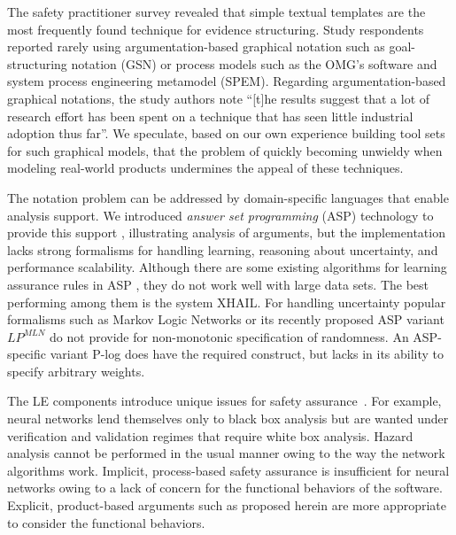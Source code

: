 
The safety practitioner survey revealed that simple textual templates are the most frequently found technique for evidence structuring. Study respondents reported rarely using argumentation-based graphical notation such as goal-structuring notation (GSN) or process models such as the OMG's software and system process engineering metamodel (SPEM).  Regarding argumentation-based graphical notations, the study authors note ``[t]he results suggest that a lot of research effort has been spent on a technique that has seen little industrial adoption thus far''.  We speculate, based on our own experience building tool sets for such graphical models, that the problem of quickly becoming unwieldy when modeling real-world products undermines the appeal of these techniques. 

The notation problem can be addressed by domain-specific languages that enable analysis support.  We introduced {\em answer set programming\/} (ASP) technology to provide this support \cite{CertWareABSA}, illustrating analysis of arguments, but the implementation lacks strong formalisms for handling learning, reasoning about uncertainty, and performance scalability.  Although there are some existing algorithms for learning assurance rules in ASP \cite{ray2009nonmonotonic,athakravi2013learning,law2014inductive,athakravi2015inductive,iled,kazmi2017improving}, they do not work well with large data sets. The best performing among them is the system XHAIL.  For handling uncertainty popular formalisms such as Markov Logic Networks or its recently proposed ASP variant $LP^{MLN}$ do not provide for non-monotonic specification of randomness.  An ASP-specific variant P-log does have the required construct, but lacks in its ability to specify arbitrary weights.  

The LE components introduce unique issues for safety assurance~\cite{SafetyANN}. For example, neural networks lend themselves only to black box analysis but are wanted under verification and validation regimes that require white box analysis.  Hazard analysis cannot be performed in the usual manner owing to the way the network algorithms work.  Implicit, process-based safety assurance is insufficient for neural networks owing to a lack of concern for the functional behaviors of the software.  Explicit, product-based arguments such as proposed herein are more appropriate to consider the functional behaviors. 




